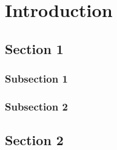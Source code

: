 
\chapter{Introduction}\label{chapter:introduction}

	\section{Section 1}\label{sec:section_one}
	
		\subsection{Subsection 1}\label{subsec:subsec_one}
		\subsection{Subsection 2}\label{subsec:subsec_two}
	
	\section{Section 2}\label{sec:section_two}